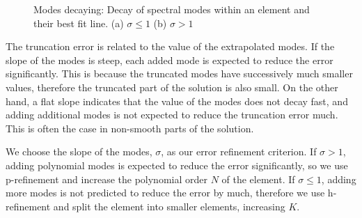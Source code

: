 \begin{figure}[H]
	\centering
	\hfill
	\caption{Modes decaying: Decay of spectral modes within an element and their best fit line. (a) \(\sigma \leqslant 1\) (b) \(\sigma > 1\)}\label{fig:decaying_modes}
\end{figure}

The truncation error is related to the value of the extrapolated modes. If the slope of the modes is
steep, each added mode is expected to reduce the error significantly. This is because the truncated
modes have successively much smaller values, therefore the truncated part of the solution is also
small. On the other hand, a flat slope indicates that the value of the modes does not decay fast,
and adding additional modes is not expected to reduce the truncation error much. This is often the
case in non-smooth parts of the solution.

We choose the slope of the modes, \(\sigma \), as our error refinement criterion. If \(\sigma > 1\),
adding polynomial modes is expected to reduce the error significantly, so we use p-refinement and
increase the polynomial order \(N\) of the element. If \(\sigma \leqslant 1\), adding more modes is
not predicted to reduce the error by much, therefore we use h-refinement and split the element into
smaller elements, increasing \(K\).

